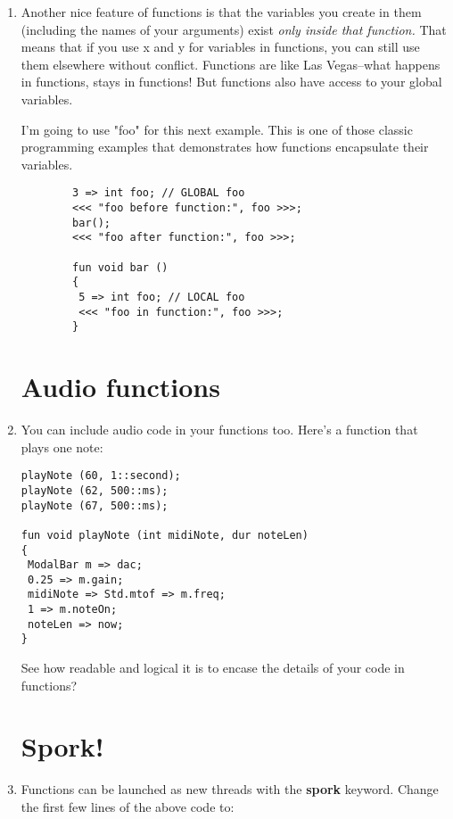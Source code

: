 \documentclass{article}
\begin{document}
\begin {enumerate}
\textsl{This example illustrates that the output type (float) is independent of the types of the arguments.}

\item Another nice feature of functions is that the variables you create in them (including the names of your arguments) exist \textsl{only inside that function.} That means that if you use x and y for variables in functions, you can still use them elsewhere without conflict. Functions are like Las Vegas--what happens in functions, stays in functions! But functions also have access to your global variables.

\pagebreak

I'm going to use "foo" for this next example. This is one of those classic programming examples that demonstrates how functions encapsulate their variables.

\begin{lstlisting}
		3 => int foo; // GLOBAL foo
		<<< "foo before function:", foo >>>;
		bar();
		<<< "foo after function:", foo >>>;
		
		fun void bar ()
		{
		 5 => int foo; // LOCAL foo
		 <<< "foo in function:", foo >>>;
		}
\end{lstlisting}

\section{Audio functions}
\item You can include audio code in your functions too. Here's a function that plays one note:

\begin{lstlisting}
playNote (60, 1::second);
playNote (62, 500::ms);
playNote (67, 500::ms);

fun void playNote (int midiNote, dur noteLen)
{
 ModalBar m => dac;
 0.25 => m.gain;
 midiNote => Std.mtof => m.freq;
 1 => m.noteOn;
 noteLen => now;
}
\end{lstlisting}

See how readable and logical it is to encase the details of your code in functions?

\section{Spork!}

\item Functions can be launched as new threads with the \textbf{spork} keyword. Change the first few lines of the above code to:


\end{enumerate}
\end{document}

